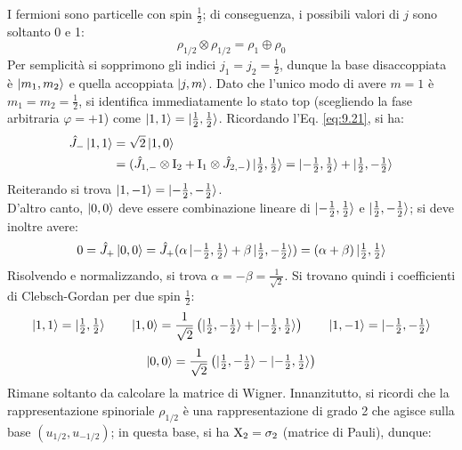 I fermioni sono particelle con spin $ \frac{1}{2} $; di conseguenza, i possibili valori di $ j $ sono soltanto 0 e 1:
\begin{equation*}
	\rho_{1/2} \otimes \rho_{1/2} = \rho_1 \oplus \rho_0
\end{equation*}
Per semplicità si sopprimono gli indici $ j_1 = j_2 = \frac{1}{2} $, dunque la base disaccoppiata è $ \ket{m_1,m_2} $ e quella accoppiata $ \ket{j,m} $. Dato che l'unico modo di avere $ m = 1 $ è $ m_1 = m_2 = \frac{1}{2} $, si identifica immediatamente lo stato top (scegliendo la fase arbitraria $ \varphi = +1 $) come $ \ket{1,1} = \ket{\tfrac{1}{2},\tfrac{1}{2}} $.
Ricordando l'Eq. \ref{eq:9.21}, si ha:
\begin{equation*}
	\begin{split}
		\hat{J}_- \ket{1,1}
		&= \sqrt{2} \ket{1,0} \\
		&= ( \hat{J}_{1,-} \otimes \mathrm{I}_2 + \mathrm{I}_1 \otimes \hat{J}_{2,-} ) \ket{\tfrac{1}{2},\tfrac{1}{2}} = \ket{-\tfrac{1}{2},\tfrac{1}{2}} + \ket{\tfrac{1}{2},-\tfrac{1}{2}}
	\end{split}
\end{equation*}
Reiterando si trova $ \ket{1,-1} = \ket{-\frac{1}{2},-\frac{1}{2}} $.\\
D'altro canto, $ \ket{0,0} $ deve essere combinazione lineare di $ \ket{-\frac{1}{2},\frac{1}{2}} $ e $ \ket{\frac{1}{2},-\frac{1}{2}} $; si deve inoltre avere:
\begin{equation*}
	0 = \hat{J}_+ \ket{0,0} = \hat{J}_+ ( \alpha \ket{-\tfrac{1}{2},\tfrac{1}{2}} + \beta \ket{\tfrac{1}{2},-\tfrac{1}{2}} ) = \left( \alpha + \beta \right) \ket{\tfrac{1}{2},\tfrac{1}{2}}
\end{equation*}
Risolvendo e normalizzando, si trova $ \alpha = -\beta = \frac{1}{\sqrt{2}} $. Si trovano quindi i coefficienti di Clebsch-Gordan per due spin $ \frac{1}{2} $:
\begin{equation*}
	\ket{1,1} = \ket{\tfrac{1}{2},\tfrac{1}{2}}
	\qquad
	\ket{1,0} = \frac{1}{\sqrt{2}} \left( \ket{\tfrac{1}{2},-\tfrac{1}{2}} + \ket{-\tfrac{1}{2},\tfrac{1}{2}} \right)
	\qquad
	\ket{1,-1} = \ket{-\tfrac{1}{2},-\tfrac{1}{2}}
\end{equation*}
\begin{equation*}
	\ket{0,0} = \frac{1}{\sqrt{2}} \left( \ket{\tfrac{1}{2},-\tfrac{1}{2}} - \ket{-\tfrac{1}{2},\tfrac{1}{2}} \right)
\end{equation*}
Rimane soltanto da calcolare la matrice di Wigner. Innanzitutto, si ricordi che la rappresentazione spinoriale $ \rho_{1/2} $ è una rappresentazione di grado 2 che agisce sulla base $ (u_{1/2},u_{-1/2}) $; in questa base, si ha $ \mathrm{X}_2 = \sigma_2 $ (matrice di Pauli), dunque:
